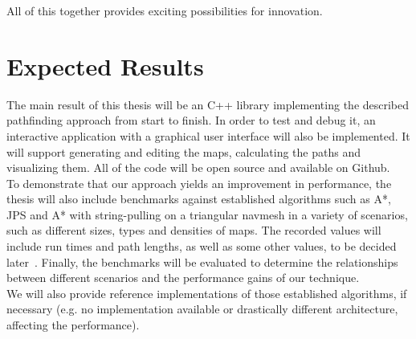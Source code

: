 \documentclass{article}
\begin{document}
All of this together provides exciting possibilities for innovation.

\section{Expected Results}

The main result of this thesis will be an C++ library implementing the described pathfinding approach from start to finish. In order to test and debug it, an interactive application with a graphical user interface will also be implemented. It will support generating and editing the maps, calculating the paths and visualizing them. All of the code will be open source and available on Github. \\

To demonstrate that our approach yields an improvement in performance, the thesis will also include benchmarks against established algorithms such as A*, JPS and A* with string-pulling on a triangular navmesh in a variety of scenarios, such as different sizes, types and densities of maps. The recorded values will include run times and path lengths, as well as some other values, to be decided later~\cite{sturtevant2012benchmarks}. Finally, the benchmarks will be evaluated to determine the relationships between different scenarios and the performance gains of our technique. \\

We will also provide reference implementations of those established algorithms, if necessary (e.g. no implementation available or drastically different architecture, affecting the performance). 
\end{document}
